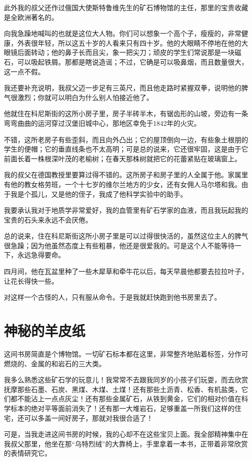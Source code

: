 \documentclass[10pt]{book}
\begin{document}
此外我的叔父还作过俄国大使斯特鲁维先生的矿石博物馆的主任，那里的宝贵收藏是全欧洲著名的。

向我急躁地喊叫的也就是这位大人物。你们可以想象一个高个子，瘦瘦的，非常健康，外表很年轻，所以这五十岁的人看来只有四十岁。他的大眼睛不停地在他的大眼镜后面转动；他的鼻子长而且尖，象一把尖刀；顽皮的学生们常说那是一块磁石，可以吸起铁屑。那都是瞎说造谣；不过，它确是可以吸鼻烟，而且数量很大，这一点不假。

我还要补充说明，我叔父迈一步足有三英尺，而且他走路时紧握双拳，说明他的脾气很激烈；你就可以明白为什么别人怕接近他了。

他就住在科尼斯街的这所小房子里，房子半砖半木，有锯齿形的山坡，旁边有一条弯弯曲曲的运河穿过汉堡旧城中心，那地区幸免于1842年的火灾。

不错，这所老房子有些歪斜，而且向外凸出；它的屋顶倒向一边，有些象土根朋的学生的便帽；它的垂直线条也不太高明；可是总的说来，它还很牢固，这是由于它前面长着一株根深叶茂的老榆树；在春天那株树就把它的花蕾紧贴在玻璃窗上。

我的叔父在德国教授里要算过得不错的。这所房子和房子里的人全属于他。家属里有他的教女格劳班，一个十七岁的维尔兰地方的少女，还有女佣人马尔塔和我。由于我是个孤儿，又是他的侄子，我成了他科学实验中的助手。

我要承认我对于地质学非常爱好，我的血管里有矿石学家的血液，而且我玩起我的宝贵的石头来永远不会厌倦。

总的说来，住在科尼斯街这所小房子里是可以过得很快活的，虽然这位主人的脾气很急躁；因为他虽然态度上有些粗暴，他还是很爱我的。可是这个人不能等待一下，永远急得要命。

四月间，他在瓦盆里种了一些木犀草和牵牛花以后，每天早晨他都要去拉拉叶子，让花长得快一些。

对这样一个古怪的人，只有服从命令。于是我就赶快跑到他书房里去了。

\chapter{神秘的羊皮纸}
这间书房简直是个博物馆。一切矿石标本都在这里，非常整齐地贴着标签，分作可燃烧的、金属的和岩石的三大类。

我多么熟悉这些矿石学的玩意儿！我常常不去跟我同岁的小孩子们玩耍，而去欣赏抚摩那些石墨、石炭、黑煤、木煤、土煤！还有那些土沥青、松香、有机盐类，它们都不能沾上一点点灰尘！还有那些金属矿石，从铁到黄金，它们的相对价值在科学标本的绝对平等面前消失了！还有那一大堆岩石，足够重盖一所我们这样的住宅，还可以多盖一间好房子，那就对我很合适了！

可是，当我走进这间书房的时候，我的心却不在这些宝贝上面。我全部精神集中在我叔父那里，他坐在那“乌特烈绒”的大靠椅上，手里拿着一本书，正带着非常欣赏的表情研究它。
\end{document}
